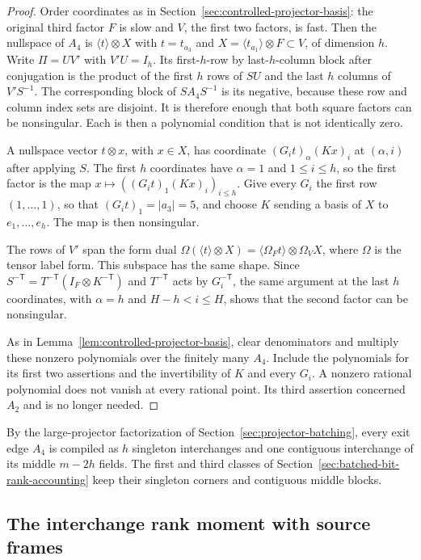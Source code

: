 \begin{proof}
Order coordinates as in Section~\ref{sec:controlled-projector-basis}: the
original third factor $F$ is slow and $V$, the first two factors, is fast.
Then the nullspace of $A_4$ is $\langle t\rangle\otimes X$ with
$t=t_{a_3}$ and $X=\langle t_{a_1}\rangle\otimes F\subset V$, of dimension $h$.
Write $\Pi=UV'$ with $V'U=I_h$. Its first-$h$-row by last-$h$-column block
after conjugation is the product of the first $h$ rows of $SU$ and the last
$h$ columns of $V'S^{-1}$. The corresponding block of $SA_4S^{-1}$ is its
negative, because these row and column index sets are disjoint. It is
therefore enough that both square factors can be nonsingular. Each is then a
polynomial condition that is not identically zero.

A nullspace vector $t\otimes x$, with $x\in X$, has coordinate
$(G_it)_\alpha(Kx)_i$ at $(\alpha,i)$ after applying $S$. The first $h$
coordinates have $\alpha=1$ and $1\le i\le h$, so the first factor is the
map $x\mapsto((G_it)_1(Kx)_i)_{i\le h}$. Give every $G_i$ the first row
$(1,\ldots,1)$, so that $(G_it)_1=|a_3|=5$, and choose $K$ sending a basis
of $X$ to $e_1,\ldots,e_h$. The map is then nonsingular.

The rows of $V'$ span the form dual $\Omega(\langle t\rangle\otimes X)
=\langle\Omega_Ft\rangle\otimes\Omega_VX$, where $\Omega$ is the tensor label
form. This subspace has the same shape. Since
$S^{-\mathsf T}=T^{-\mathsf T}(I_F\otimes K^{-\mathsf T})$ and
$T^{-\mathsf T}$ acts by $G_i^{-\mathsf T}$, the same argument at the last
$h$ coordinates, with $\alpha=h$ and $H-h<i\le H$, shows that the second
factor can be nonsingular.

As in Lemma~\ref{lem:controlled-projector-basis}, clear denominators and
multiply these nonzero polynomials over the finitely many $A_4$. Include
the polynomials for its first two assertions and the invertibility of
$K$ and every $G_i$. A nonzero rational polynomial does not vanish at every
rational point. Its third assertion concerned $A_2$ and is no longer needed.
\end{proof}

By the large-projector factorization of Section~\ref{sec:projector-batching},
every exit edge $A_4$ is compiled as $h$ singleton interchanges and one
contiguous interchange of its middle $m-2h$ fields. The first and third
classes of Section~\ref{sec:batched-bit-rank-accounting} keep their
singleton corners and contiguous middle blocks.

\subsection{The interchange rank moment with source frames}
\label{sec:source-frame-bit-moment}

